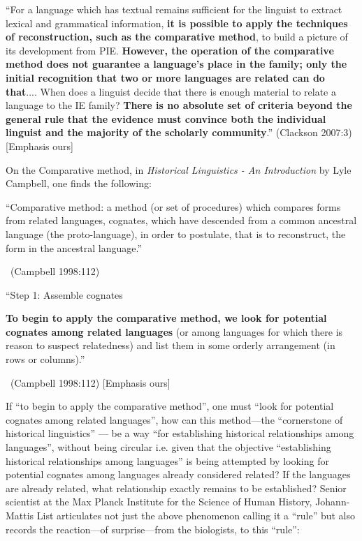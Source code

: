 \begin{myquote}
“For a language which has textual remains sufficient for the linguist to extract lexical and grammatical information, \textbf{it is possible to apply the techniques of reconstruction, such as the comparative method}, to build a picture of its development from PIE. \textbf{However, the operation of the comparative method does not guarantee a language’s place in the family; only the initial recognition that two or more languages are related can do that}.... When does a linguist decide that there is enough material to relate a language to the IE family? \textbf{There is no absolute set of criteria beyond the general rule that the evidence must convince both the individual linguist and the majority of the scholarly community}.” \hfill (Clackson 2007:3) [Emphasis ours]
\end{myquote}

On the Comparative method, in \textit{Historical Linguistics - An Introduction} by Lyle Campbell, one finds the following:

\begin{myquote}
“Comparative method: a method (or set of procedures) which compares forms from related languages, cognates, which have descended from a common ancestral language (the proto-language), in order to postulate, that is to reconstruct, the form in the ancestral language.” 

~\hfill (Campbell 1998:112)
\end{myquote}

\begin{myquote}
“Step 1: Assemble cognates
\end{myquote}

\begin{myquote}
\textbf{To begin to apply the comparative method, we look for potential cognates among related languages} (or among languages for which there is reason to suspect relatedness) and list them in some orderly arrangement (in rows or columns).” 

~\hfill (Campbell 1998:112) [Emphasis ours]
\end{myquote}

If “to begin to apply the comparative method”, one must “look for potential cognates among related languages”, how can this method—the “cornerstone of historical linguistics” — be a way “for establishing historical relationships among languages”, without being circular i.e. given that the objective “establishing historical relationships among languages” is being attempted by looking for potential cognates among languages already considered related? If the languages are already related, what relationship exactly remains to be established? Senior scientist at the Max Planck Institute for the Science of Human History, Johann-Mattis List articulates not just the above phenomenon calling it a “rule” but also records the reaction—of surprise—from the biologists, to this “rule”:


